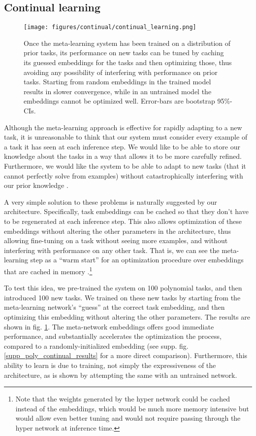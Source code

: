 \documentclass{article}
\begin{document}
\subsection{Continual learning}
\begin{figure}
\centering
\texttt{[image: figures/continual/continual\_learning.png]}
\caption{Once the meta-learning system has been trained on a distribution of prior tasks, its performance on new tasks can be tuned by caching its guessed embeddings for the tasks and then optimizing those, thus avoiding any possibility of interfering with performance on prior tasks. Starting from random embeddings in the trained model results in slower convergence, while in an untrained model the embeddings cannot be optimized well. Error-bars are bootstrap 95\%-CIs.}
\label{poly_continual_results}
\end{figure}
Although the meta-learning approach is effective for rapidly adapting to a new task, it is unreasonable to think that our system must consider every example of a task it has seen at each inference step. We would like to be able to store our knowledge about the tasks in a way that allows it to be more carefully refined. Furthermore, we would like the system to be able to adapt to new tasks (that it cannot perfectly solve from examples) without catastrophically interfering with our prior knowledge \citep{McCloskey1989}. \par
A very simple solution to these problems is naturally suggested by our architecture. Specifically, task embeddings can be cached so that they don't have to be regenerated at each inference step. This also allows optimization of these embeddings without altering the other parameters in the architecture, thus allowing fine-tuning on a task without seeing more examples, and without interfering with performance on any other task. That is, we can see the meta-learning step as a ``warm start'' for an optimization procedure over embeddings that are cached in memory \citep[c.f.][]{Kumaran2016}.\footnote{Note that the weights generated by the hyper network could be cached instead of the embeddings, which would be much more memory intensive but would allow even better tuning and would not require passing through the hyper network at inference time.} \par 
To test this idea, we pre-trained the system on 100 polynomial tasks, and then introduced 100 new tasks. We trained on these new tasks by starting from the meta-learning network's ``guess'' at the correct task embedding, and then optimizing this embedding without altering the other parameters. The results are shown in fig. \ref{poly_continual_results}. The meta-network embeddings offers good immediate performance, and substantially accelerates the optimization the process, compared to a randomly-initialized embedding (see supp. fig. \ref{supp_poly_continual_results} for a more direct comparison). Furthermore, this ability to learn is due to training, not simply the expressiveness of the architecture, as is shown by attempting the same with an untrained network. \par 
\end{document}
